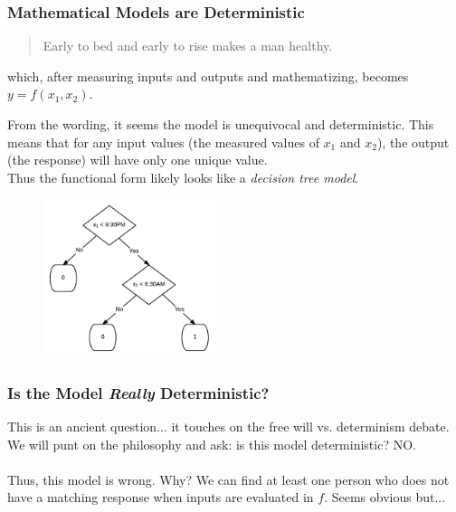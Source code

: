 \documentclass[slides]{beamer} %
\begin{document}
\begin{frame}\frametitle{Mathematical Models are Deterministic}

\small
\begin{quotation}
Early to bed and early to rise makes a man healthy.
\end{quotation}

which, after measuring inputs and outputs and mathematizing, becomes $y = f(x_1, x_2)$.\\

\begin{minipage}{0.4\textwidth}
\footnotesize
From the wording, it seems the model is unequivocal and deterministic. This means \pause that for any input values (the measured values of $x_1$ and $x_2$), the output (the response) will have only one unique value.\\
\vspace{0.2cm}
Thus the functional form likely looks like a \textit{decision tree model}.
\end{minipage}%
\begin{minipage}{0.6\textwidth}
\begin{figure}
\centering
\includegraphics[width=2in]{simple_health}
\end{figure}
\end{minipage}
	
\end{frame}

\begin{frame}\frametitle{Is the Model \textit{Really} Deterministic?}

This is an ancient question... it touches on the free will vs. determinism debate. We will punt on the philosophy and ask: is this model deterministic? \pause NO. \\~\\

Thus, this model is wrong. Why? We can find at least one person who does not have a matching response when inputs are evaluated in $f$. Seems obvious but...

\end{frame}
\end{document}
